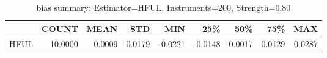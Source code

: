 \begin{table}[ht]
\centering
\caption{bias summary: Estimator=HFUL, Instruments=200, Strength=0.80}
\begin{tabular}{lrrrrrrrr}
\toprule
 & COUNT & MEAN & STD & MIN & 25\% & 50\% & 75\% & MAX \\
\midrule
HFUL & 10.0000 & 0.0009 & 0.0179 & -0.0221 & -0.0148 & 0.0017 & 0.0129 & 0.0287 \\
\bottomrule
\end{tabular}
\end{table}
